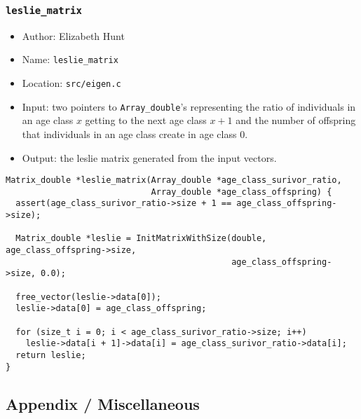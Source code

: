 \documentclass[11pt]{article}
\begin{document}
\subsubsection{\texttt{leslie\_matrix}}
\label{sec:org0637da1}
\begin{itemize}
\item Author: Elizabeth Hunt
\item Name: \texttt{leslie\_matrix}
\item Location: \texttt{src/eigen.c}
\item Input: two pointers to \texttt{Array\_double}'s representing the ratio of individuals in an age class
\(x\) getting to the next age class \(x+1\) and the number of offspring that individuals in an age
class create in age class 0.
\item Output: the leslie matrix generated from the input vectors.
\end{itemize}

\begin{verbatim}
Matrix_double *leslie_matrix(Array_double *age_class_surivor_ratio,
                             Array_double *age_class_offspring) {
  assert(age_class_surivor_ratio->size + 1 == age_class_offspring->size);

  Matrix_double *leslie = InitMatrixWithSize(double, age_class_offspring->size,
                                             age_class_offspring->size, 0.0);

  free_vector(leslie->data[0]);
  leslie->data[0] = age_class_offspring;

  for (size_t i = 0; i < age_class_surivor_ratio->size; i++)
    leslie->data[i + 1]->data[i] = age_class_surivor_ratio->data[i];
  return leslie;
}
\end{verbatim}
\subsection{Appendix / Miscellaneous}
\label{sec:orgddf0893}
\end{document}

